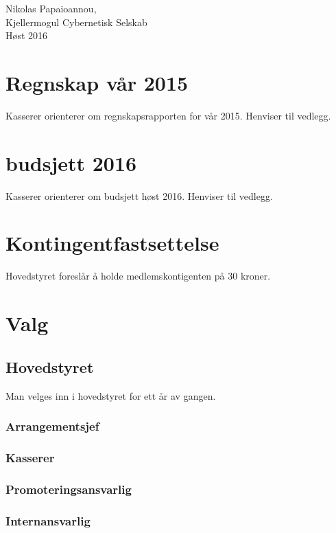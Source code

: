 \documentclass[16pt,norsk,a4paper]{article}
\begin{document}
Nikolas Papaioannou,\\
Kjellermogul Cybernetisk Selskab\\
Høst 2016

\newpage

\section{Regnskap vår 2015}
Kasserer orienterer om regnskapsrapporten for vår 2015. Henviser til vedlegg.\\


\section{budsjett 2016}
Kasserer orienterer om budsjett høst 2016. Henviser til vedlegg.\\


\section{Kontingentfastsettelse}
Hovedstyret foreslår å holde medlemskontigenten på 30 kroner.\\

\section{Valg}

\subsection{Hovedstyret}
Man velges inn i hovedstyret for ett år av gangen.

\subsubsection{Arrangementsjef}

\subsubsection{Kasserer}

\subsubsection{Promoteringsansvarlig}

\subsubsection{Internansvarlig}
\end{document}
